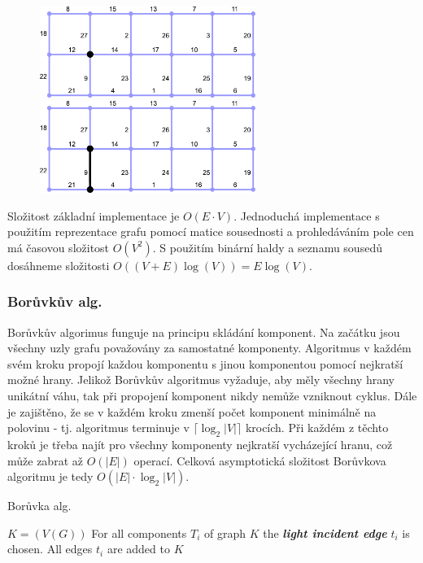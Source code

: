 \begin{figure}[h]
    \begin{center}
        \includegraphics[width=70mm]{spolecne/02/images/prim01}
        \hspace{10px}
        \includegraphics[width=70mm]{spolecne/02/images/prim02}
    \end{center}
\end{figure}
\vspace{-10px}

Složitost základní implementace je $O(E\cdot V)$. Jednoduchá implementace s použitím reprezentace grafu pomocí matice sousednosti a prohledáváním pole cen má časovou složitost $O(V^2)$. S použitím binární haldy a seznamu sousedů dosáhneme složitosti $O((V + E) \log(V)) = E \log(V)$.


\subsubsection{Borůvkův alg.}
Borůvkův algorimus funguje na principu skládání komponent. Na začátku jsou všechny uzly grafu považovány za samostatné komponenty. Algoritmus v každém svém kroku propojí každou komponentu s jinou komponentou pomocí nejkratší možné hrany. Jelikož Borůvkův algoritmus vyžaduje, aby měly všechny hrany unikátní váhu, tak při propojení komponent nikdy nemůže vzniknout cyklus. Dále je zajištěno, že se v každém kroku zmenší počet komponent minimálně na polovinu - tj. algoritmus terminuje v $\lceil \log_{2} \vert V \vert \rceil$ krocích. Při každém z těchto kroků je třeba najít pro všechny komponenty nejkratší vycházející hranu, což může zabrat až $O(\vert E \vert)$ operací. Celková asymptotická složitost Borůvkova algoritmu je tedy $O(\vert E\vert \cdot \log_{2} \vert V \vert)$.

\begin{algorithm}
\caption{Borůvka alg.}
\begin{algorithmic}
\State $K=(V(G))$
  \State For all components $T_i$ of graph $K$ the \textbf{\textit{light incident edge}} $t_i$ is chosen.
  \State All edges $t_i$ are added to $K$
\EndWhile
\end{algorithmic}
\end{algorithm}

